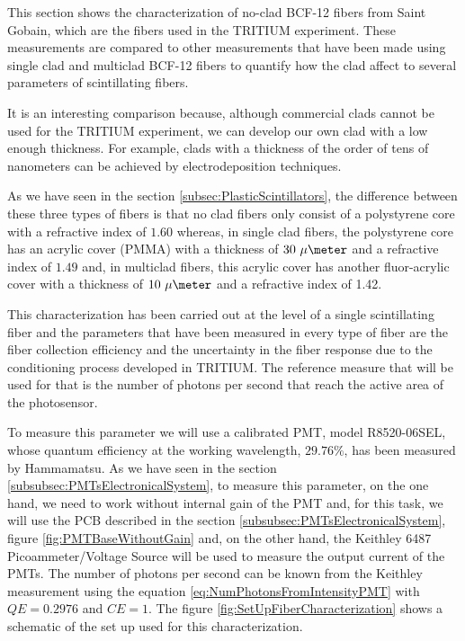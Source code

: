 This section shows the characterization of no-clad BCF-12 fibers from Saint Gobain, which are the fibers used in the TRITIUM experiment. These measurements are compared to other measurements that have been made using single clad and multiclad BCF-12 fibers to quantify how the clad affect to several parameters of scintillating fibers.

It is an interesting comparison because, although commercial clads cannot be used for the TRITIUM experiment, we can develop our own clad with a low enough thickness. For example, clads with a thickness of the order of tens of nanometers can be achieved by electrodeposition techniques.

As we have seen in the section \ref{subsec:PlasticScintillators}, the difference between these three types of fibers is that no clad fibers only consist of a polystyrene core with a refractive index of $1.60$ whereas, in single clad fibers, the polystyrene core has an acrylic cover (PMMA) with a thickness of $30~\mu\meter$ and a refractive index of $1.49$ and, in multiclad fibers, this acrylic cover has another fluor-acrylic cover with a thickness of $10~\mu\meter$ and a refractive index of 1.42.




This characterization has been carried out at the level of a single scintillating fiber and the parameters that have been measured in every type of fiber are the fiber collection efficiency and the uncertainty in the fiber response due to the conditioning process developed in TRITIUM. The reference measure that will be used for that is the number of photons per second that reach the active area of the photosensor.

To measure this parameter we will use a calibrated PMT, model R8520-06SEL, whose quantum efficiency at the working wavelength, $29.76\%$, has been measured by Hammamatsu. As we have seen in the section \ref{subsubsec:PMTsElectronicalSystem}, to measure this parameter, on the one hand, we need to work without internal gain of the PMT and, for this task, we will use the PCB described in the section \ref{subsubsec:PMTsElectronicalSystem}, figure \ref{fig:PMTBaseWithoutGain} and, on the other hand, the Keithley 6487 Picoammeter/Voltage Source will be used to measure the output current of the PMTs. The number of photons per second can be known from the Keithley measurement using the equation \ref{eq:NumPhotonsFromIntensityPMT} with $QE=0.2976$ and $CE=1$. The figure \ref{fig:SetUpFiberCharacterization} shows a schematic of the set up used for this characterization.

